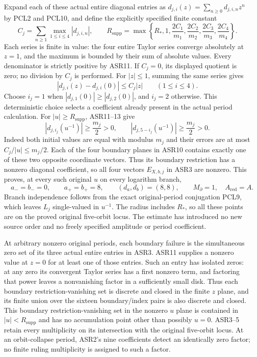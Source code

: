 \documentclass[11pt,a4paper]{article}
\begin{document}
Expand each of these actual entire diagonal entries as
$d_{j,i}(z)=\sum_{n\ge0}d_{j,i,n}z^n$ by PCL2 and PCL10, and
define the explicitly specified finite constant
\[
 C_j=\sum_{n\ge1}\max_{1\le i\le4}|d_{j,i,n}|,
 \qquad
 R_{\mathrm{supp}}=
 \max\left\{R_*,1,\frac{2C_1}{m_1},\frac{2C_2}{m_2},
                       \frac{2C_3}{m_3},\frac{2C_4}{m_4}\right\}.
 \tag{ASR12}
\]
Each series is finite in value: the four entire Taylor series converge
absolutely at $z=1$, and the maximum is bounded by their sum of absolute
values. Every denominator is strictly positive by ASR11. If $C_j=0$,
its displayed quotient is zero; no division by $C_j$ is performed.
For $|z|\le1$, summing the same series gives
\[
 |d_{j,i}(z)-d_{j,i}(0)|\le C_j|z|\qquad(1\le i\le4).
 \tag{ASR13}
\]
Choose $i_j=1$ when $|d_{j,1}(0)|\ge|d_{j,2}(0)|$, and $i_j=2$
otherwise. This deterministic choice selects a coefficient already
present in the actual period calculation. For $|u|\ge R_{\mathrm{supp}}$,
ASR11--13 give
\[
 |d_{j,i_j}(u^{-1})|\ge\frac{m_j}{2}>0,
 \qquad |d_{j,5-i_j}(u^{-1})|\ge\frac{m_j}{2}>0.
 \tag{ASR14}
\]
Indeed both initial values are equal with modulus $m_j$ and their
errors are at most $C_j/|u|\le m_j/2$. Each of the four boundary
planes in ASR10 contains exactly one of these two opposite coordinate
vectors. Thus its boundary restriction has a nonzero diagonal
coefficient, so all four vectors $E_{X,b,j}$ in ASR3 are nonzero.
This proves, at every such original $u$ on every logarithm branch,
\[
\boxed{\quad
 a_-=b_-=0,\qquad a_+=b_+=8,\qquad
 (d_a,d_b)=(8,8),\qquad M_{\partial}=1,\quad A_{\mathrm{red}}=A.
 \quad}\tag{ASR15}
\]
Branch independence follows from the exact original-period conjugation
PCL9, which leaves $L_j$ single-valued in $u^{-1}$. The radius includes
$R_*$, so all these points are on the proved original five-orbit locus.
The estimate has introduced no new source order and no freely specified
amplitude or period coefficient.

At arbitrary nonzero original periods, each boundary failure is the
simultaneous zero set of its three actual entire entries in ASR3.
ASR11 supplies a nonzero value at $z=0$ for at least one of those
entries. Such an entry has isolated zeros: at any zero its convergent
Taylor series has a first nonzero term, and factoring that power
leaves a nonvanishing factor in a sufficiently small disk. Thus each
boundary restriction-vanishing set is discrete and closed in the finite $z$ plane,
and its finite union over the sixteen boundary/index pairs is also
discrete and closed. This boundary restriction-vanishing set in the nonzero $u$ plane
is contained in $|u|<R_{\mathrm{supp}}$ and has no accumulation
point other than possibly $u=0$. ASR3--5 retain every multiplicity
on its intersection with the original five-orbit locus. At an orbit-collapse
period, ASR2's nine coefficients detect an identically zero factor;
no finite ruling multiplicity is assigned to such a factor.
\end{document}

